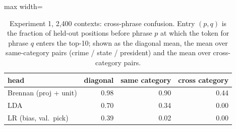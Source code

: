 \begin{table}[t]
\centering
\footnotesize
\caption{Experiment 1, 2{,}400 contexts: cross-phrase confusion. Entry $(p,q)$ is the fraction of held-out positions before phrase $p$ at which the token for phrase $q$ enters the top-10; shown as the diagonal mean, the mean over same-category pairs (crime / state / president) and the mean over cross-category pairs.}
\label{tab:e1_confusion}
\begin{adjustbox}{max width=\textwidth}
\begin{tabular}{lrrr}
\toprule
head & diagonal & same category & cross category \\
\midrule
Brennan (proj + unit) & 0.98 & 0.90 & 0.44 \\
LDA & 0.70 & 0.34 & 0.00 \\
LR (bias, val.\ pick) & 0.39 & 0.02 & 0.00 \\
\bottomrule
\end{tabular}
\end{adjustbox}
\end{table}